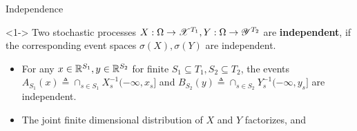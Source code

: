 \documentclass[12pt,aspectratio=169]{beamer}
\begin{document}
\begin{frame}{Independence}
\begin{Definition}<1->
Two stochastic processes $X: \Omega \to \mathscr{X}^{T_1},Y:\Omega\to \mathscr{Y}^{T_2}$ are \textbf{independent}, if the corresponding event spaces $\sigma(X), \sigma(Y)$ are independent. 
\end{Definition}
\begin{Remark}
\begin{itemize}
    \item <2-> For any $x \in \mathbb{R}^{S_1}, y \in \mathbb{R}^{S_2}$ for finite $S_1 \subseteq T_1, S_2\subseteq T_2$, 
    the events $A_{S_1}(x) \triangleq \cap_{s\in S_1}X_s^{-1}(-\infty, x_s]$ and $B_{S_2}(y) \triangleq \cap_{s \in S_2}Y_s^{-1}(-\infty, y_s]$ are independent. 
    \item <3-> The joint finite dimensional distribution of $X$ and $Y$ factorizes, and 
\end{itemize}
\end{Remark}
\end{frame}
\end{document}
